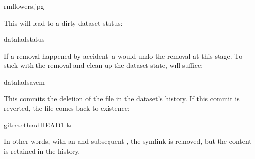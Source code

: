 \begin{sphinxVerbatim}[commandchars=\\\{\}]
rmflowers.jpg
\end{sphinxVerbatim}

\sphinxAtStartPar
This will lead to a dirty dataset status:

\begin{sphinxVerbatim}[commandchars=\\\{\}]
dataladstatus
\end{sphinxVerbatim}

\sphinxAtStartPar
If a removal happened by accident, a  would undo
the removal at this stage. To stick with the removal and clean up the dataset
state,  will suffice:

\begin{sphinxVerbatim}[commandchars=\\\{\}]
dataladsave\PYGZhy{}m
\end{sphinxVerbatim}

\sphinxAtStartPar
This commits the deletion of the file in the dataset’s history.
If this commit is reverted, the file comes back to existence:

%
\begin{sphinxVerbatim}[commandchars=\\\{\}]
gitreset\PYGZhy{}\PYGZhy{}hardHEAD\PYGZti{}1
ls
\end{sphinxVerbatim}
\sphinxresetverbatimhllines

\sphinxAtStartPar
In other words, with an  and subsequent ,
the symlink is removed, but the content is retained in the history.

\ignorespaces 

